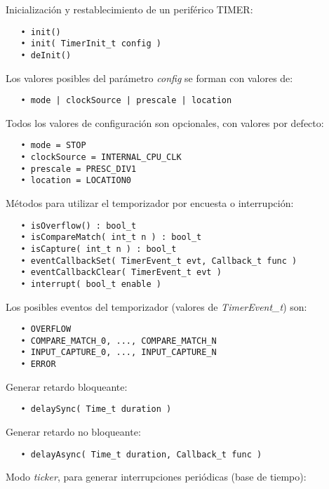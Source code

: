 
Inicialización y restablecimiento de un periférico TIMER:

\begin{verbatim}
   • init()
   • init( TimerInit_t config )
   • deInit()
\end{verbatim}

Los valores posibles del parámetro \emph{config} se forman con valores de:

\begin{verbatim}
   • mode | clockSource | prescale | location
\end{verbatim}

Todos los valores de configuración son opcionales, con valores por defecto:

\begin{verbatim}
   • mode = STOP
   • clockSource = INTERNAL_CPU_CLK
   • prescale = PRESC_DIV1
   • location = LOCATION0   
\end{verbatim}

Métodos para utilizar el temporizador por encuesta o interrupción:

\begin{verbatim}
   • isOverflow() : bool_t
   • isCompareMatch( int_t n ) : bool_t
   • isCapture( int_t n ) : bool_t
   • eventCallbackSet( TimerEvent_t evt, Callback_t func )
   • eventCallbackClear( TimerEvent_t evt )
   • interrupt( bool_t enable )
\end{verbatim}

Los posibles eventos del temporizador (valores de \emph{TimerEvent\_t}) son:

\begin{verbatim}
   • OVERFLOW
   • COMPARE_MATCH_0, ..., COMPARE_MATCH_N
   • INPUT_CAPTURE_0, ..., INPUT_CAPTURE_N
   • ERROR
\end{verbatim}


Generar retardo bloqueante:

\begin{verbatim}
   • delaySync( Time_t duration )
\end{verbatim}

Generar retardo no bloqueante:

\begin{verbatim}
   • delayAsync( Time_t duration, Callback_t func )
\end{verbatim}

Modo \emph{ticker}, para generar interrupciones periódicas (base de tiempo):


